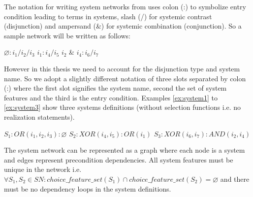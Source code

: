 The notation for writing system networks from \citep{Halliday2013} uses colon (:) to symbolize entry condition leading to terms in systems, slash (/) for systemic contrast (disjunction) and ampersand (\&) for systemic combination (conjunction). So a sample network will be written as follows:

\begin{exe}
	\ex\label{ex:system10} $\varnothing: i_1 / i_2/i_3 $
	\ex\label{ex:system11} $i_1: i_4 / i_5 $
	\ex\label{ex:system12} $i_2$ \& $i_4: i_6 / i_7 $
\end{exe}

However in this thesis we need to account for the disjunction type and system name. So we adopt a slightly different notation of three slots separated by colon (:) where the first slot signifies the system name, second the set of system features and the third is the entry condition. Examples \ref{ex:system1} to \ref{ex:system3} show three systems definitions (without selection functions i.e. no realization statements). 
\begin{exe}
	\ex\label{ex:system1} $S_1:OR(i_1,i_2,i_3):\varnothing$
	\ex\label{ex:system2} $S_2:XOR(i_4,i_5):OR(i_1)$
	\ex\label{ex:system3} $S_3:XOR(i_6,i_7):AND(i_2,i_4)$
\end{exe}

The system network can be represented as a graph where each node is a system and edges represent precondition dependencies. All system features must be unique in the network i.e. ${\forall S_1, S_2 \in SN: choice\_feature\_set(S_1) \cap choice\_feature\_set(S_2) = \varnothing}$ and there must be no dependency loops in the system definitions.

